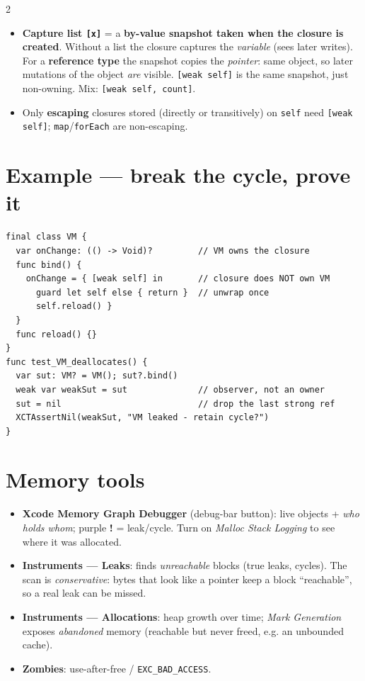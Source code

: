 \documentclass[8pt]{extarticle}
\begin{document}
\begin{multicols}{2}
\begin{itemize}
        children strongly, \texttt{child.parent}, \texttt{list.prev} are
        \texttt{weak}; (4) \textbf{Timer} — the run loop retains it: also
        \texttt{invalidate()}.
  \item \textbf{Capture list \texttt{[x]}} = a \textbf{by-value snapshot taken
        when the closure is created}. Without a list the closure captures the
        \emph{variable} (sees later writes). For a \textbf{reference type} the
        snapshot copies the \emph{pointer}: same object, so later mutations of
        the object \emph{are} visible. \texttt{[weak self]} is the same
        snapshot, just non-owning. Mix: \texttt{[weak self, count]}.
  \item Only \textbf{escaping} closures stored (directly or transitively) on
        \texttt{self} need \texttt{[weak self]}; \texttt{map}/\texttt{forEach}
        are non-escaping.
\end{itemize}

\section{Example — break the cycle, prove it}
\begin{lstlisting}[language=SwiftSheet]
final class VM {
  var onChange: (() -> Void)?         // VM owns the closure
  func bind() {
    onChange = { [weak self] in       // closure does NOT own VM
      guard let self else { return }  // unwrap once
      self.reload() }
  }
  func reload() {}
}
func test_VM_deallocates() {
  var sut: VM? = VM(); sut?.bind()
  weak var weakSut = sut              // observer, not an owner
  sut = nil                           // drop the last strong ref
  XCTAssertNil(weakSut, "VM leaked - retain cycle?")
}
\end{lstlisting}

\section{Memory tools}
\begin{itemize}
  \item \textbf{Xcode Memory Graph Debugger} (debug-bar button): live objects +
        \emph{who holds whom}; purple \textbf{!} = leak/cycle. Turn on
        \emph{Malloc Stack Logging} to see where it was allocated.
  \item \textbf{Instruments — Leaks}: finds \emph{unreachable} blocks (true leaks, cycles).
        The scan is \emph{conservative}: bytes that look like a pointer keep a block
        ``reachable'', so a real leak can be missed.
  \item \textbf{Instruments — Allocations}: heap growth over time;
        \emph{Mark Generation} exposes \emph{abandoned} memory (reachable but
        never freed, e.g. an unbounded cache).
  \item \textbf{Zombies}: use-after-free / \texttt{EXC\_BAD\_ACCESS}.
\end{itemize}


\end{multicols}
\end{document}
